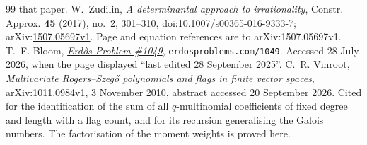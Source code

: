 \documentclass[11pt]{article}
\begin{document}
\begin{thebibliography}{99}
  that paper.
 W.~Zudilin, \emph{A determinantal approach to
  irrationality}, Constr. Approx. \textbf{45} (2017), no.~2, 301--310,
  doi:\href{https://doi.org/10.1007/s00365-016-9333-7}{10.1007/s00365-016-9333-7};
  arXiv:\href{https://arxiv.org/abs/1507.05697v1}{1507.05697v1}.
  Page and equation references are to arXiv:1507.05697v1.
 T.~F. Bloom,
  \href{https://www.erdosproblems.com/1049}{\emph{Erd\H{o}s Problem \#1049}},
  \texttt{erdosproblems.com/1049}. Accessed 28 July 2026, when the page
  displayed ``last edited 28 September 2025''.
 C.~R. Vinroot,
  \href{https://arxiv.org/abs/1011.0984}{\emph{Multivariate Rogers--Szeg\H{o}
  polynomials and flags in finite vector spaces}}, arXiv:1011.0984v1,
  3 November 2010, abstract accessed 20 September 2026.  Cited for the
  identification of the sum of all $q$-multinomial coefficients of fixed
  degree and length with a flag count, and for its recursion generalising the
  Galois numbers.  The factorisation of the moment weights is proved here.
\end{thebibliography}
\end{document}
